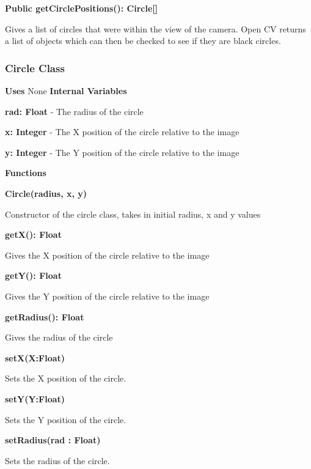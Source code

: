 \documentclass [10pt]{article}
\begin{document}
\textbf{Public getCirclePositions(): Circle[]}

Gives a list of circles that were within the view of the camera. Open CV returns a list of objects which can then be checked to see if they are black circles.

\subsubsection{Circle Class}

\textbf{Uses}
None
\textbf{Internal Variables}

\textbf{rad: Float} - The radius of the circle

\textbf{x: Integer} - The X position of the circle relative to the image

\textbf{y: Integer} - The Y position of the circle relative to the image 

\textbf{Functions}

\textbf{Circle(radius, x, y)}

Constructor of the circle class, takes in initial radius, x and y values

\textbf{getX(): Float}

Gives the X position of the circle relative to the image

\textbf{getY(): Float}

Gives the Y position of the circle relative to the image

\textbf{getRadius(): Float}

Gives the radius of the circle

\textbf{setX(X:Float)}

Sets the X position of the circle.

\textbf{setY(Y:Float)}

Sets the Y position of the circle.

\textbf{setRadius(rad : Float)}

Sets the radius of the circle.
\end{document}
